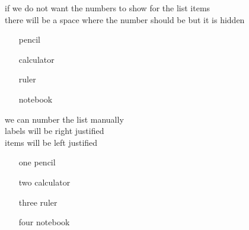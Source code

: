\documentclass[11pt]{article}
\begin{document}
\vspace{1cm}

if we do not want the numbers to show for the list items\\
there will be a space where the number should be but it is hidden\\
\begin{enumerate}
\item[] pencil
\item[] calculator
\item[] ruler
\item[] notebook
\end{enumerate}

\vspace{1cm}

we can number the list manually\\
labels will be right justified\\
items will be left justified\\
\begin{enumerate}
\item[one] pencil
\item[two] calculator
\item[three] ruler
\item[four] notebook
\end{enumerate}
\end{document}
